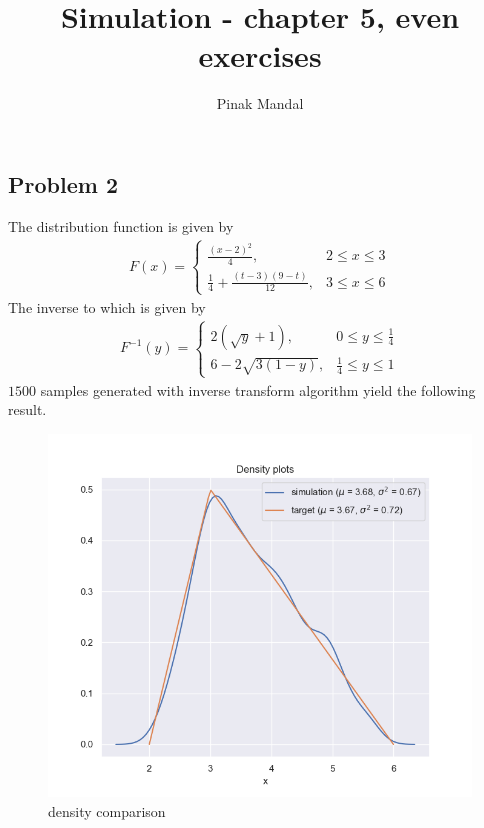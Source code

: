 \documentclass{article}
\title{Simulation - chapter 5, even exercises}
\author{Pinak Mandal}
\date{}
\begin{document}
\subsection*{Problem 2}
The distribution function is given by
\begin{align*}
  F(x) = \begin{cases}
            \frac{(x-2)^2}{4}, & 2\le x\le 3 \\
            \frac{1}{4} + \frac{(t-3)(9-t)}{12}, & 3\le x\le 6
        \end{cases}
\end{align*}
The inverse to which is given by
\begin{align*}
  F^{-1}(y) = \begin{cases}
                2(\sqrt{y}+1), & 0\le y\le \frac{1}{4}\\
                6-2\sqrt{3(1-y)}, & \frac{1}{4}\le y\le 1
              \end{cases}
\end{align*}
$1500$ samples generated with inverse transform algorithm yield the following result.
\begin{figure}[h!]
    \centering
    \includegraphics[width=\linewidth]{../images/p2_density_it_1500.png}
    \caption{density comparison}
\end{figure}
\newpage
\end{document}
